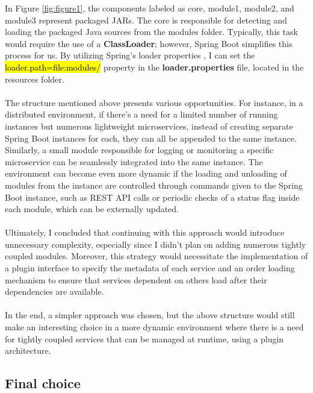 \noindent In Figure \ref{fig:figure1}, the components labeled as core, module1, module2, and module3 represent packaged JARs. The core is responsible for detecting and loading the packaged Java sources from the modules folder. Typically, this task would require the use of a \textbf{ClassLoader}; however, Spring Boot simplifies this process for us. By utilizing Spring's loader properties \cite{springboot-loader-properties}, I can set the \hl{loader.path=file:modules/} property in the \textbf{loader.properties} file, located in the resources folder.
\\\\
The structure mentioned above presents various opportunities. For instance, in a distributed environment, if there's a need for a limited number of running instances but numerous lightweight microservices, instead of creating separate Spring Boot instances for each, they can all be appended to the same instance. Similarly, a small module responsible for logging or monitoring a specific microservice can be seamlessly integrated into the same instance. The environment can become even more dynamic if the loading and unloading of modules from the instance are controlled through commands given to the Spring Boot instance, such as REST API calls or periodic checks of a status flag inside each module, which can be externally updated.
\\\\
\noindent Ultimately, I concluded that continuing with this approach would introduce unnecessary complexity, especially since I didn't plan on adding numerous tightly coupled modules. Moreover, this strategy would necessitate the implementation of a plugin interface to specify the metadata of each service and an order loading mechanism to ensure that services dependent on others load after their dependencies are available.
\\\\
In the end, a simpler approach was chosen, but the above structure would still make an interesting choice in a more dynamic environment where there is a need for tightly coupled services that can be managed at runtime, using a plugin architecture.

\subsection{Final choice}


